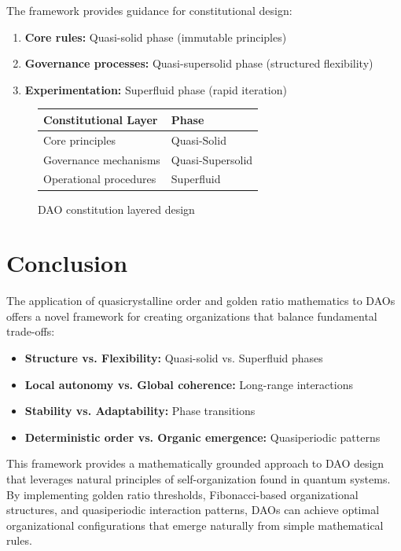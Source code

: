 \documentclass[AMA]{WileyNJD-AMA}
\begin{document}
The framework provides guidance for constitutional design:

\begin{enumerate}
    \item \textbf{Core rules:} Quasi-solid phase (immutable principles)
    \item \textbf{Governance processes:} Quasi-supersolid phase (structured flexibility)
    \item \textbf{Experimentation:} Superfluid phase (rapid iteration)
\end{enumerate}

\begin{figure}[h]
\centering
\begin{minipage}{0.6\textwidth}
\begin{tabular}{p{2in}p{2in}}
\hline
\textbf{Constitutional Layer} & \textbf{Phase} \\
\hline
Core principles & Quasi-Solid \\
Governance mechanisms & Quasi-Supersolid \\
Operational procedures & Superfluid \\
\hline
\end{tabular}
\end{minipage}
\caption{DAO constitution layered design}
\label{fig:constitution}
\end{figure}

\section{Conclusion}

The application of quasicrystalline order and golden ratio mathematics to DAOs offers a novel framework for creating organizations that balance fundamental trade-offs:

\begin{itemize}
    \item \textbf{Structure vs. Flexibility:} Quasi-solid vs. Superfluid phases
    \item \textbf{Local autonomy vs. Global coherence:} Long-range interactions
    \item \textbf{Stability vs. Adaptability:} Phase transitions
    \item \textbf{Deterministic order vs. Organic emergence:} Quasiperiodic patterns
\end{itemize}

This framework provides a mathematically grounded approach to DAO design that leverages natural principles of self-organization found in quantum systems. By implementing golden ratio thresholds, Fibonacci-based organizational structures, and quasiperiodic interaction patterns, DAOs can achieve optimal organizational configurations that emerge naturally from simple mathematical rules.
\end{document}
